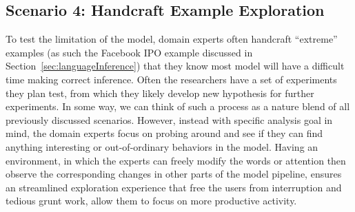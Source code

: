 \subsection{Scenario 4: Handcraft Example Exploration}
To test the limitation of the model, domain experts often handcraft ``extreme'' examples (as such the Facebook IPO example discussed in Section~\ref{sec:languageInference}) that they know most model will have a difficult time making correct inference. 
%
Often the researchers have a set of experiments they plan test, from which they likely develop new hypothesis for further experiments.
%
In some way, we can think of such a process as a nature blend of all previously discussed scenarios. However,  instead with specific analysis goal in mind, the domain experts focus on probing around and see if they can find anything interesting or out-of-ordinary behaviors in the model.
%
Having an environment, in which the experts can freely modify the words or attention then observe the corresponding changes in other parts of the model pipeline, ensures an streamlined exploration experience that free the users from interruption and tedious grunt work, allow them to focus on more productive activity. 

